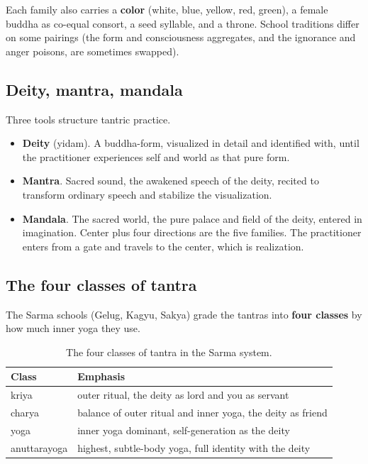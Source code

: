 Each family also carries a \textbf{color} (white, blue, yellow, red, green), a female buddha as co-equal consort, a seed syllable, and a throne. School traditions differ on some pairings (the form and consciousness aggregates, and the ignorance and anger poisons, are sometimes swapped).

\subsection{Deity, mantra, mandala}

Three tools structure tantric practice.

\begin{itemize}
 \item \textbf{Deity} (yidam). A buddha-form, visualized in detail and identified with, until the practitioner experiences self and world as that pure form.
 \item \textbf{Mantra}. Sacred sound, the awakened speech of the deity, recited to transform ordinary speech and stabilize the visualization.
 \item \textbf{Mandala}. The sacred world, the pure palace and field of the deity, entered in imagination. Center plus four directions are the five families. The practitioner enters from a gate and travels to the center, which is realization.
\end{itemize}

\subsection{The four classes of tantra}

The Sarma schools (Gelug, Kagyu, Sakya) grade the tantras into \textbf{four classes} by how much inner yoga they use.

\begin{longtable}{l L{8.0cm} }
\caption{The four classes of tantra in the Sarma system.}\\
\toprule
\textbf{Class} & \textbf{Emphasis} \\
\midrule
kriya & outer ritual, the deity as lord and you as servant \\
charya & balance of outer ritual and inner yoga, the deity as friend \\
yoga & inner yoga dominant, self-generation as the deity \\
anuttarayoga & highest, subtle-body yoga, full identity with the deity \\
\bottomrule
\end{longtable}

